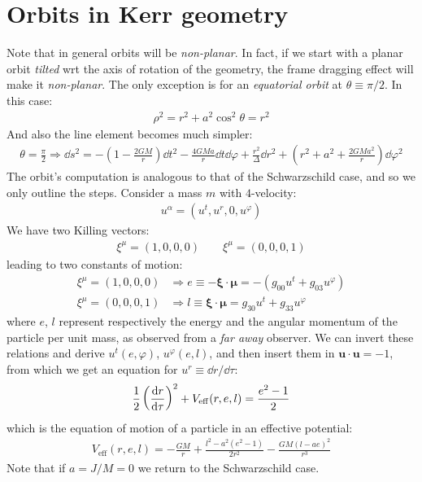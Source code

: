 \documentclass[../template.tex]{subfiles}
\begin{document}
\section{Orbits in Kerr geometry}
Note that in general orbits will be \textit{non-planar}. In fact, if we start with a planar orbit \textit{tilted} wrt the axis of rotation of the geometry, the frame dragging effect will make it \textit{non-planar}. The only exception is for an \textit{equatorial orbit} at $\theta \equiv \pi/2$. In this case:
\begin{align*}
    \rho^2 = r^2 + a^2 \cos^2 \theta =r^2
\end{align*}
And also the line element becomes much simpler:
\begin{align*}
    \theta = \frac{\pi}{2} \Rightarrow \dd{s}^2 = -\left(1-\frac{2GM}{r} \right) \dd{t^2} - \frac{4GMa}{r} \dd{t} \dd{\varphi} + \frac{r^2}{\Delta} \dd{r^2} + \left(r^2 + a^2 + \frac{2GMa^2}{r} \right)  \dd{\varphi^2}
\end{align*}
The orbit's computation is analogous to that of the Schwarzschild case, and so we only outline the steps. Consider a mass $m$ with $4$-velocity:
\begin{align*}
    u^\alpha = (u^t, u^r, 0, u^\varphi)
\end{align*}  
We have two Killing vectors:
\begin{align*}
    \xi^\mu = (1,0,0,0) \qquad \xi^\mu = (0,0,0,1)
\end{align*}
leading to two constants of motion:
\begin{align*}
    \xi^\mu = (1,0,0,0) &\Rightarrow e \equiv -\bm{\xi}\cdot \bm{\mu} = -(g_{00}u^t + g_{03} u^\varphi) \\
    \xi^\mu = (0,0,0,1) &\Rightarrow l \equiv \bm{\xi}\cdot \bm{\mu} = g_{30} u^t + g_{33} u^\varphi
\end{align*}
where $e$, $l$ represent respectively the energy and the angular momentum of the particle per unit mass, as observed from a \textit{far away} observer. We can invert these relations and derive $u^t(e,\varphi)$, $u^\varphi(e,l)$, and then insert them in $\bm{u}\cdot \bm{u} = -1$, from which we get an equation for $u^r \equiv \dd{r}/\dd{\tau}$:
\begin{align*}
    \frac{1}{2}\left(\dv{r}{\tau}\right)^2 + V_{\mathrm{eff}}(r,e,l) = \frac{e^2-1}{2} 
\end{align*}       
which is the equation of motion of a particle in an effective potential:
\begin{align}
    V_{\mathrm{eff} }(r,e,l) = -\frac{GM}{r} + \frac{l^2 -a^2(e^2-1)}{2r^2} - \frac{GM(l-ae)^2}{r^3}   \label{eqn:motion-kerr}
\end{align}
Note that if $a=J/M=0$ we return to the Schwarzschild case.
\end{document}
